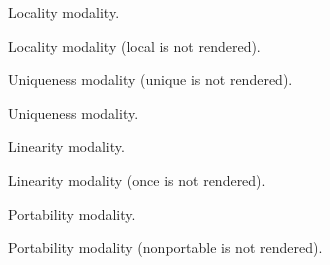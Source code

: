 \label{Oxcaml--type-modalities_all}\begin{ocamlindent}\label{Oxcaml--type-modalities_all.f_global}%
\begin{ocamlindent}Locality modality.\end{ocamlindent}%
\label{Oxcaml--type-modalities_all.f_local}%
\begin{ocamlindent}Locality modality (local is not rendered).\end{ocamlindent}%
\label{Oxcaml--type-modalities_all.f_unique}%
\begin{ocamlindent}Uniqueness modality (unique is not rendered).\end{ocamlindent}%
\label{Oxcaml--type-modalities_all.f_aliased}%
\begin{ocamlindent}Uniqueness modality.\end{ocamlindent}%
\label{Oxcaml--type-modalities_all.f_many}%
\begin{ocamlindent}Linearity modality.\end{ocamlindent}%
\label{Oxcaml--type-modalities_all.f_once}%
\begin{ocamlindent}Linearity modality (once is not rendered).\end{ocamlindent}%
\label{Oxcaml--type-modalities_all.f_portable}%
\begin{ocamlindent}Portability modality.\end{ocamlindent}%
\label{Oxcaml--type-modalities_all.f_nonportable}%
\begin{ocamlindent}Portability modality (nonportable is not rendered).\end{ocamlindent}%

\end{ocamlindent}
